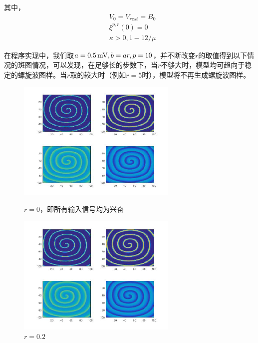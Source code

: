 \documentclass[
pdflinks,
]{xjtuthesis}
\begin{document}
其中，
\begin{align*}
&V_0 = V_{rest} = B_0\\
&\xi^{p,r}(0) = 0\\
&\kappa > {0, 1-12/ \mu}
\end{align*}

在程序实现中，我们取$a=0.5\,\mathrm{mV}, b=ar, p=10$，并不断改变$r$的取值得到以下情况的斑图情况，可以发现，在足够长的步数下，当$r$不够大时，模型均可趋向于稳定的螺旋波图样。当$r$取的较大时（例如$r=5$时），模型将不再生成螺旋波图样。

\clearpage

\begin{figure}[!ht]
\begin{minipage}[!ht]{0.5\linewidth}
\centering
\includegraphics[width=3.0in]{figures/p10r0_1.jpg}
\caption{$r=0$，即所有输入信号均为兴奋}
\end{minipage}%
\begin{minipage}[!ht]{0.5\linewidth}
\centering
\includegraphics[width=3.0in]{figures/p10r0_2_1.jpg}
\caption{$r=0.2$}
\end{minipage}
\end{figure}
\end{document}
